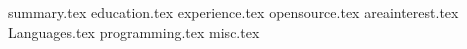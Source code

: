 \documentclass[11pt, a4paper]{awesome-cv}
\newcommand*{\sectiondir}{resume/}
\begin{document}
\makecvheader

{summary.tex}
{education.tex}
{experience.tex}
{opensource.tex}
{areainterest.tex}
{Languages.tex}
{programming.tex}
{misc.tex}
\end{document}
